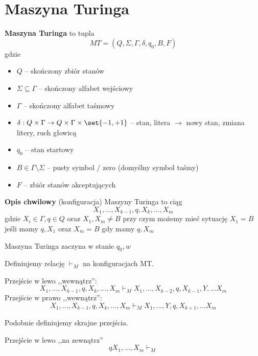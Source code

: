 \section{Maszyna Turinga}
\begin{definition}
    \textbf{Maszyna Turinga} to tupla
    \[
        MT = (Q, \Sigma, \Gamma, \delta, q_0, B, F)
    \]
    gdzie
    \begin{itemize}
        \item \( Q \) -- skończony zbiór stanów
        \item \( \Sigma \subseteq \Gamma \) -- skończony alfabet wejściowy
        \item \( \Gamma \) -- skończony alfabet taśmowy
        \item \( \delta : Q \times \Gamma \rightarrow 
        Q \times \Gamma \times \set{-1, +1}
        \) -- stan, litera \( \rightarrow \) nowy stan, zmiana litery, ruch głowicą
        \item \( q_0 \) -- stan startowy
        \item \( B \in \Gamma \setminus \Sigma \) -- pusty symbol / zero (domyślny symbol taśmy)
        \item \( F \) -- zbiór stanów akceptujących
    \end{itemize}
\end{definition}

\begin{definition}
    \textbf{Opis chwilowy} (konfiguracja) Maszyny Turinga to
    ciąg
    \[
        X_1, \dots, X_{k-1}, q, X_k, \dots, X_m
    \]
    gdzie \( X_i \in \Gamma, q \in Q\) oraz \( X_1, X_m \neq B \) przy czym możemy mieć sytuację \( X_1 = B \) jeśli mamy \( q, X_1 \) oraz \( X_m = B \) gdy mamy \( q, X_m \) 
    
    Maszyna Turinga zaczyna w stanie \( q_0, w \)
\end{definition}

\begin{definition}
    Definiujemy relację \( \vdash_M \) na konfiguracjach MT.
    
    Przejście w lewo ,,wewnątrz'':
    \[
        X_1, \dots, X_{k-1}, q, X_k, \dots, X_m
        \vdash_M
        X_1, \dots, X_{k-2}, q, X_{k-1}, Y, \dots X_m
    \]
    Przejście w prawo ,,wewnątrz'':
    \[
        X_1, \dots, X_{k-1}, q, X_k, \dots, X_m
        \vdash_M
        X_1, \dots, Y, q, X_{k+1}, \dots X_m
    \]
    
    Podobnie definiujemy skrajne przejścia.
    
    Przejście w lewo ,,na zewnątrz''
    \[
        q X_1, \dots, X_m \vdash_M
    \]
    
    
\end{definition}


